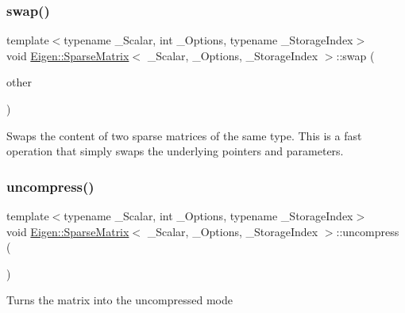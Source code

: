 \subsubsection{\texorpdfstring{swap()}{swap()}}
{\footnotesize\ttfamily template$<$typename \+\_\+\+Scalar, int \+\_\+\+Options, typename \+\_\+\+Storage\+Index$>$ \\
void \mbox{\hyperlink{class_eigen_1_1_sparse_matrix}{Eigen\+::\+Sparse\+Matrix}}$<$ \+\_\+\+Scalar, \+\_\+\+Options, \+\_\+\+Storage\+Index $>$\+::swap (\begin{DoxyParamCaption}\item[{\mbox{\hyperlink{class_eigen_1_1_sparse_matrix}{Sparse\+Matrix}}$<$ \+\_\+\+Scalar, \+\_\+\+Options, \+\_\+\+Storage\+Index $>$ \&}]{other }\end{DoxyParamCaption})\hspace{0.3cm}{\ttfamily [inline]}}

Swaps the content of two sparse matrices of the same type. This is a fast operation that simply swaps the underlying pointers and parameters. \mbox{\label{class_eigen_1_1_sparse_matrix_a7e560ebda035e992d2c99875cc7c3af3}} 
\subsubsection{\texorpdfstring{uncompress()}{uncompress()}}
{\footnotesize\ttfamily template$<$typename \+\_\+\+Scalar, int \+\_\+\+Options, typename \+\_\+\+Storage\+Index$>$ \\
void \mbox{\hyperlink{class_eigen_1_1_sparse_matrix}{Eigen\+::\+Sparse\+Matrix}}$<$ \+\_\+\+Scalar, \+\_\+\+Options, \+\_\+\+Storage\+Index $>$\+::uncompress (\begin{DoxyParamCaption}{ }\end{DoxyParamCaption})\hspace{0.3cm}{\ttfamily [inline]}}

Turns the matrix into the uncompressed mode \mbox{\label{class_eigen_1_1_sparse_matrix_a9d4354d3f4d121d764bbed33cac05329}} 
